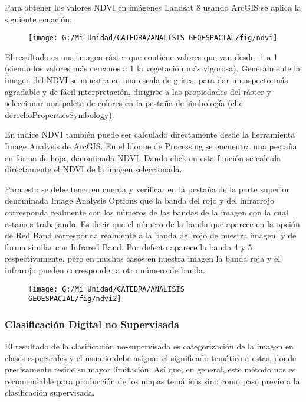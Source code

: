 \documentclass[a4paper,oneside,11pt,]{article}
\begin{document}
Para obtener los valores NDVI en imágenes Landsat 8 usando ArcGIS se aplica la siguiente ecuación:

\begin{figure}
\centering
\texttt{[image: G:/Mi Unidad/CATEDRA/ANALISIS GEOESPACIAL/fig/ndvi]}
\end{figure}

El resultado es una imagen ráster que contiene valores que van desde -1 a 1 (siendo los valores más cercanos a 1 la vegetación más vigorosa). Generalmente la imagen del NDVI se muestra en una escala de grises, para dar un aspecto más agradable y de fácil interpretación, dirigirse a las propiedades del ráster y seleccionar una paleta de colores en la pestaña de simbología (clic derecho\textrightarrow Properties\textrightarrow Symbology).
\par En índice NDVI también puede ser calculado directamente desde la herramienta Image Analysis de ArcGIS. En el bloque de Processing se encuentra una pestaña en forma de hoja, denominada NDVI. Dando click en esta función se calcula directamente el NDVI de la imagen seleccionada.
\par Para esto se debe tener en cuenta y verificar en la pestaña de la parte superior denominada Image Analysis Options que la banda del rojo y del infrarrojo corresponda realmente con los números de las bandas de la imagen con la cual estamos trabajando. Es decir que el número de la banda que aparece en la opción de Red Band corresponda realmente a la banda del rojo de nuestra imagen, y de forma similar con Infrared Band. Por defecto aparece la banda 4 y 5 respectivamente, pero en muchos casos en nuestra imagen la banda roja y el infrarojo pueden corresponder a otro número de banda.

\begin{figure}
\centering
\texttt{[image: G:/Mi Unidad/CATEDRA/ANALISIS GEOESPACIAL/fig/ndvi2]}
\end{figure}

\subsubsection{Clasificación Digital no Supervisada}
El resultado de la clasificación no-supervisada es categorización de la imagen en clases espectrales y el usuario debe asignar el significado temático a estas, donde precisamente reside su mayor limitación. Así que, en general, este método nos es recomendable para producción de los mapas temáticos sino como paso previo a la clasificación supervisada.
\end{document}
